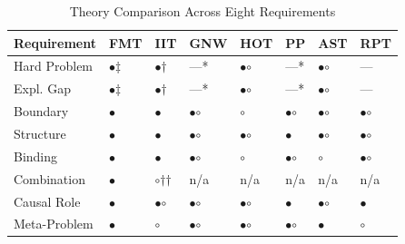 \documentclass[12pt]{article}
\begin{document}
\begin{table}[H]
\caption{Theory Comparison Across Eight Requirements}
\label{tab:theory-comparison}
\centering
\footnotesize
\begin{tabularx}{\textwidth}{lXXXXXXX}
\toprule
\textbf{Requirement} & \textbf{FMT} & \textbf{IIT} & \textbf{GNW} & \textbf{HOT} & \textbf{PP} & \textbf{AST} & \textbf{RPT} \\
\midrule
Hard Problem & {$\bullet$}$\ddagger$ & {$\bullet$}$\dagger$ & ---* & {\large$\bullet$\hspace{-8.5pt}$\circ$} & ---* & {\large$\bullet$\hspace{-8.5pt}$\circ$} & --- \\
Expl. Gap & {$\bullet$}$\ddagger$ & {$\bullet$}$\dagger$ & ---* & {\large$\bullet$\hspace{-8.5pt}$\circ$} & ---* & {\large$\bullet$\hspace{-8.5pt}$\circ$} & --- \\
Boundary & {$\bullet$} & {$\bullet$} & {\large$\bullet$\hspace{-8.5pt}$\circ$} & {$\circ$} & {\large$\bullet$\hspace{-8.5pt}$\circ$} & {\large$\bullet$\hspace{-8.5pt}$\circ$} & {\large$\bullet$\hspace{-8.5pt}$\circ$} \\
Structure & {$\bullet$} & {$\bullet$} & {\large$\bullet$\hspace{-8.5pt}$\circ$} & {\large$\bullet$\hspace{-8.5pt}$\circ$} & {$\bullet$} & {\large$\bullet$\hspace{-8.5pt}$\circ$} & {\large$\bullet$\hspace{-8.5pt}$\circ$} \\
Binding & {$\bullet$} & {$\bullet$} & {\large$\bullet$\hspace{-8.5pt}$\circ$} & {$\circ$} & {\large$\bullet$\hspace{-8.5pt}$\circ$} & {$\circ$} & {\large$\bullet$\hspace{-8.5pt}$\circ$} \\
Combination & {$\bullet$} & {$\circ$}$\dagger$$\dagger$ & n/a & n/a & n/a & n/a & n/a \\
Causal Role & {$\bullet$} & {\large$\bullet$\hspace{-8.5pt}$\circ$} & {\large$\bullet$\hspace{-8.5pt}$\circ$} & {\large$\bullet$\hspace{-8.5pt}$\circ$} & {$\bullet$} & {\large$\bullet$\hspace{-8.5pt}$\circ$} & {$\bullet$} \\
Meta-Problem & {$\bullet$} & {$\circ$} & {\large$\bullet$\hspace{-8.5pt}$\circ$} & {\large$\bullet$\hspace{-8.5pt}$\circ$} & {\large$\bullet$\hspace{-8.5pt}$\circ$} & {$\bullet$} & {$\circ$} \\
\bottomrule
\end{tabularx}
\end{table}
\end{document}
